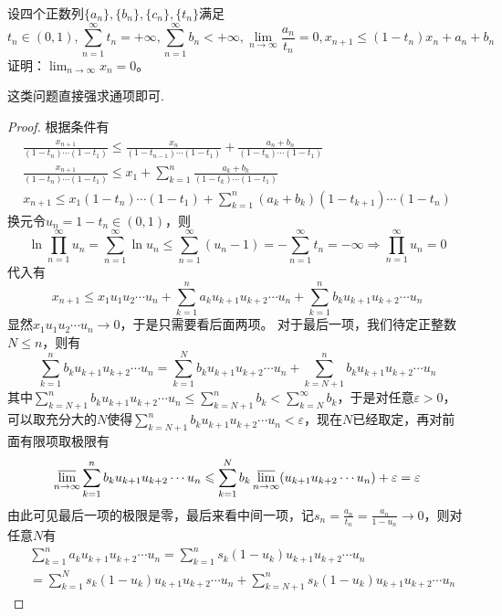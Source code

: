\documentclass[../../main.tex]{subfiles}%
\begin{document}
\begin{example}
设四个正数列\(\{a_n\},\{b_n\},\{c_n\},\{t_n\}\)满足
\[t_n\in(0,1),\sum_{n = 1}^{\infty}t_n=+\infty,\sum_{n = 1}^{\infty}b_n<+\infty,\lim_{n\rightarrow\infty}\frac{a_n}{t_n}=0,x_{n + 1}\leqslant (1 - t_n)x_n+a_n + b_n\]
证明：\(\lim_{n\rightarrow\infty}x_n = 0\)。
\end{example}
\begin{note}
这类问题直接强求通项即可.
\end{note}
\begin{proof}

根据条件有
\begin{gather*}
\frac{x_{n + 1}}{(1 - t_n)\cdots(1 - t_1)}\leqslant \frac{x_n}{(1 - t_{n-1})\cdots(1 - t_1)}+\frac{a_n + b_n}{(1 - t_n)\cdots(1 - t_1)}\\
\frac{x_{n + 1}}{(1 - t_n)\cdots(1 - t_1)}\leqslant  x_1+\sum_{k = 1}^{n}\frac{a_k + b_k}{(1 - t_k)\cdots(1 - t_1)}\\
x_{n + 1}\leqslant  x_1(1 - t_n)\cdots(1 - t_1)+\sum_{k = 1}^{n}(a_k + b_k)(1 - t_{k + 1})\cdots(1 - t_n)
\end{gather*}
换元令\(u_n = 1 - t_n\in(0,1)\)，则
\[\ln\prod_{n = 1}^{\infty}u_n=\sum_{n = 1}^{\infty}\ln u_n\leqslant \sum_{n = 1}^{\infty}(u_n - 1)=-\sum_{n = 1}^{\infty}t_n=-\infty\Rightarrow\prod_{n = 1}^{\infty}u_n = 0\]
代入有
\[x_{n + 1}\leqslant  x_1u_1u_2\cdots u_n+\sum_{k = 1}^{n}a_ku_{k + 1}u_{k + 2}\cdots u_n+\sum_{k = 1}^{n}b_ku_{k + 1}u_{k + 2}\cdots u_n\]
显然\(x_1u_1u_2\cdots u_n\rightarrow0\)，于是只需要看后面两项。
对于最后一项，我们待定正整数\(N\leqslant  n\)，则有
\[\sum_{k = 1}^{n}b_ku_{k + 1}u_{k + 2}\cdots u_n=\sum_{k = 1}^{N}b_ku_{k + 1}u_{k + 2}\cdots u_n+\sum_{k = N + 1}^{n}b_ku_{k + 1}u_{k + 2}\cdots u_n\]
其中\(\sum_{k = N + 1}^{n}b_ku_{k + 1}u_{k + 2}\cdots u_n\leqslant \sum_{k = N + 1}^{n}b_k<\sum_{k = N}^{\infty}b_k\)，于是对任意\(\varepsilon>0\)，可以取充分大的\(N\)使得\(\sum_{k = N + 1}^{n}b_ku_{k + 1}u_{k + 2}\cdots u_n<\varepsilon\)，现在\(N\)已经取定，再对前面有限项取极限有
\[\varlimsup_{n\rightarrow\infty}\sum_{k = 1}^{n}b_ku_{k + 1}u_{k + 2}\cdots u_n\leqslant \sum_{k = 1}^{N}b_k\varlimsup_{n\rightarrow\infty}(u_{k + 1}u_{k + 2}\cdots u_n)+\varepsilon=\varepsilon\]
由此可见最后一项的极限是零，最后来看中间一项，记\(s_n=\frac{a_n}{t_n}=\frac{a_n}{1 - u_n}\rightarrow0\)，则对任意\(N\)有
\begin{align*}
&\sum_{k = 1}^{n}a_ku_{k + 1}u_{k + 2}\cdots u_n=\sum_{k = 1}^{n}s_k(1 - u_k)u_{k + 1}u_{k + 2}\cdots u_n\\
&=\sum_{k = 1}^{N}s_k(1 - u_k)u_{k + 1}u_{k + 2}\cdots u_n+\sum_{k = N + 1}^{n}s_k(1 - u_k)u_{k + 1}u_{k + 2}\cdots u_n

\end{align*}
\end{proof}
\end{document}
